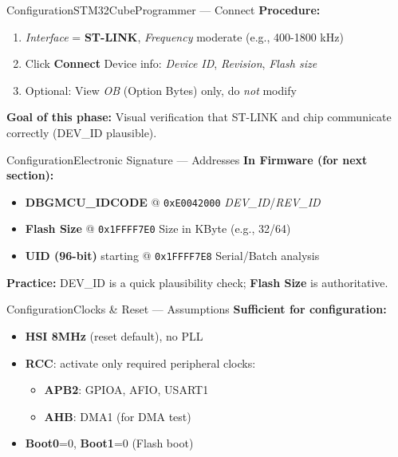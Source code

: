 \documentclass{beamer}
\begin{document}
\begin{frame}{Configuration}{STM32CubeProgrammer — Connect}
	\textbf{Procedure:}
	\begin{enumerate}
		\item \textit{Interface} = \textbf{ST-LINK}, \textit{Frequency} moderate (e.g., 400-1800 kHz)
		\item Click \textbf{Connect} \textrightarrow{} Device info: \textit{Device ID}, \textit{Revision}, \textit{Flash size}
		\item Optional: View \textit{OB} (Option Bytes) only, do \textit{not} modify
	\end{enumerate}
	
	\medskip
	\textbf{Goal of this phase:} Visual verification that ST-LINK and chip communicate correctly (DEV\_ID plausible).
\end{frame}

\begin{frame}{Configuration}{Electronic Signature — Addresses}
	\textbf{In Firmware (for next section):}
	\begin{itemize}
		\item \textbf{DBGMCU\_IDCODE} @ \texttt{0xE0042000} \textrightarrow{} \textit{DEV\_ID}/\textit{REV\_ID}
		\item \textbf{Flash Size} @ \texttt{0x1FFFF7E0} \textrightarrow{} Size in KByte (e.g., 32/64)
		\item \textbf{UID (96-bit)} starting @ \texttt{0x1FFFF7E8} \textrightarrow{} Serial/Batch analysis
	\end{itemize}
	
	\medskip
	\textbf{Practice:} DEV\_ID is a quick plausibility check; \textbf{Flash Size} is authoritative.
\end{frame}

\begin{frame}{Configuration}{Clocks \& Reset — Assumptions}
	\textbf{Sufficient for configuration:}
	\begin{itemize}
		\item \textbf{HSI 8MHz} (reset default), no PLL
		\item \textbf{RCC}: activate only required peripheral clocks:
		\begin{itemize}
			\item \textbf{APB2}: GPIOA, AFIO, USART1
			\item \textbf{AHB}: DMA1 (for DMA test)
		\end{itemize}
		\item \textbf{Boot0}=0, \textbf{Boot1}=0 (Flash boot)
	\end{itemize}
\end{frame}
\end{document}
